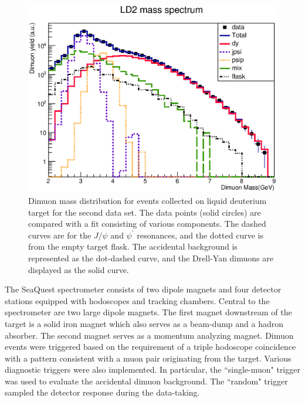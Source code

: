 \documentclass[reprint,aps,unsortedaddress,superscriptaddress,prd,floatfix,showpacs,linenumbers]{revtex4-2}
\begin{document}
\begin{figure}[tb]
\includegraphics*[width=\linewidth]{massFit/LD2_massfit}
\caption{Dimuon mass distribution for events collected 
on liquid deuterium target for the second data set.
The data points (solid circles) are
compared with a fit consisting of various components. The dashed curves are
for the $J/\psi$ and $\psi^\prime$ resonances, and the dotted curve is from the
empty target flask. The accidental background is represented as the
dot-dashed curve, and the Drell-Yan dimuons are displayed as the solid curve.}
\label{Fig:LD2_Mass}
\end{figure}


The SeaQuest spectrometer consists of two dipole magnets and 
four detector stations equipped with hodoscopes and tracking chambers.
Central to the spectrometer are two large dipole magnets. 
The first magnet downstream of the target is a solid iron magnet which
also serves as a beam-dump and a hadron absorber. The second
magnet serves as a momentum analyzing magnet. Dimuon events
were triggered based on the requirement of a triple hodoscope
coincidence with a pattern consistent with a muon pair originating
from the target. Various diagnostic triggers were also implemented.
In particular, the ``single-muon" trigger was used to evaluate the 
accidental dimuon
background. The ``random" trigger sampled the
detector response during the data-taking.
\end{document}
